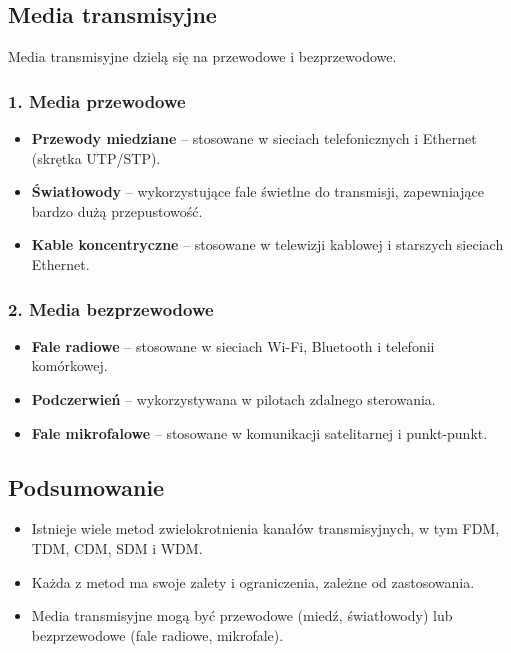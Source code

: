 \subsection{Media transmisyjne}
Media transmisyjne dzielą się na przewodowe i bezprzewodowe.

\subsubsection{1. Media przewodowe}
\begin{itemize}
    \item \textbf{Przewody miedziane} – stosowane w sieciach telefonicznych i Ethernet (skrętka UTP/STP).
    \item \textbf{Światłowody} – wykorzystujące fale świetlne do transmisji, zapewniające bardzo dużą przepustowość.
    \item \textbf{Kable koncentryczne} – stosowane w telewizji kablowej i starszych sieciach Ethernet.
\end{itemize}

\subsubsection{2. Media bezprzewodowe}
\begin{itemize}
    \item \textbf{Fale radiowe} – stosowane w sieciach Wi-Fi, Bluetooth i telefonii komórkowej.
    \item \textbf{Podczerwień} – wykorzystywana w pilotach zdalnego sterowania.
    \item \textbf{Fale mikrofalowe} – stosowane w komunikacji satelitarnej i punkt-punkt.
\end{itemize}

\subsection{Podsumowanie}
\begin{itemize}
    \item Istnieje wiele metod zwielokrotnienia kanałów transmisyjnych, w tym FDM, TDM, CDM, SDM i WDM.
    \item Każda z metod ma swoje zalety i ograniczenia, zależne od zastosowania.
    \item Media transmisyjne mogą być przewodowe (miedź, światłowody) lub bezprzewodowe (fale radiowe, mikrofale).
\end{itemize}
